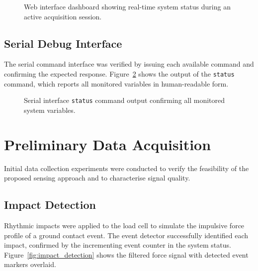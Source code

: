 \begin{figure}[h]
  \centering
  \caption{Web interface dashboard showing real-time system status during
           an active acquisition session.}
  \label{fig:webui}
\end{figure}

\subsection{Serial Debug Interface}

The serial command interface was verified by issuing each available command
and confirming the expected response.
Figure~\ref{fig:serial_status} shows the output of the \texttt{status}
command, which reports all monitored variables in human-readable form.

\begin{figure}[h]
  \centering
  \caption{Serial interface \texttt{status} command output confirming all
           monitored system variables.}
  \label{fig:serial_status}
\end{figure}

\section{Preliminary Data Acquisition}
\label{section:preliminary_data}

Initial data collection experiments were conducted to verify the feasibility
of the proposed sensing approach and to characterise signal quality.

\subsection{Impact Detection}

Rhythmic impacts were applied to the load cell to simulate the impulsive
force profile of a ground contact event.
The event detector successfully identified each impact, confirmed by the
incrementing event counter in the system status.
Figure~\ref{fig:impact_detection} shows the filtered force signal with
detected event markers overlaid.

